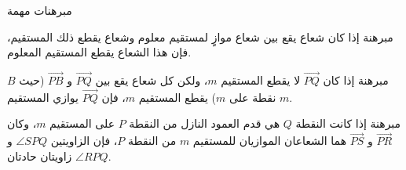 		
		
		\begin{frame}{مبرهنات مهمة}
			\begin{exampleblock}{مبرهنة}
				إذا كان شعاع يقع بين شعاع موازٍ لمستقيم معلوم وشعاع يقطع ذلك المستقيم، فإن هذا الشعاع يقطع المستقيم المعلوم.
			\end{exampleblock}
			\begin{exampleblock}{مبرهنة}
				إذا كان $\overrightarrow{PQ}$ لا يقطع المستقيم $m$، ولكن كل شعاع يقع بين $\overrightarrow{PQ}$ و $\overrightarrow{PB}$ (حيث $B$ نقطة على $m$) يقطع المستقيم $m$، فإن $\overrightarrow{PQ}$ يوازي المستقيم $m$.
			\end{exampleblock}
		\begin{exampleblock}{مبرهنة}
			إذا كانت النقطة $Q$ هي قدم العمود النازل من النقطة $P$ على المستقيم $m$، وكان $\overrightarrow{PR}$ و $\overrightarrow{PS}$ هما الشعاعان الموازيان للمستقيم $m$ من النقطة $P$، فإن الزاويتين $\angle SPQ$ و $\angle RPQ$ زاويتان حادتان.
		\end{exampleblock}		
		\end{frame}
		
